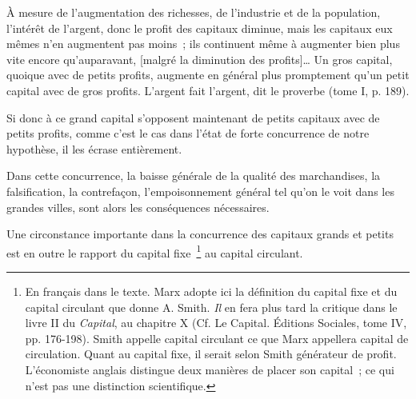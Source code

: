 \documentclass[french,twoside]{book} %
\begin{document}
\noindent À mesure de l’augmentation des richesses, de l’industrie et de la population, l’intérêt de l’argent, donc le profit des capitaux diminue, mais les capitaux eux mêmes n’en augmentent pas moins ; ils continuent même à augmenter bien plus vite encore qu’auparavant, [malgré la diminution des profits]… Un gros capital, quoique avec de petits profits, augmente en général plus promptement qu’un petit capital avec de gros profits. L’argent fait l’argent, dit le proverbe (tome I, p. 189).\par
Si donc à ce grand capital s’opposent maintenant de petits capitaux avec de petits profits, comme c’est le cas dans l’état de forte concurrence de notre hypothèse, il les écrase entièrement.\par
Dans cette concurrence, la baisse générale de la qualité des marchandises, la falsification, la contrefaçon, l’empoisonnement général tel qu’on le voit dans les grandes villes, sont alors les conséquences nécessaires.\par
[X] Une circonstance importante dans la concurrence des capitaux grands et petits est en outre le rapport du capital fixe \footnote{En français dans le texte. Marx adopte ici la définition du capital fixe et du capital circulant que donne A. Smith. \emph{Il} en fera plus tard la critique dans le livre II du \emph{Capital}, au chapitre X (Cf. Le Capital. Éditions Sociales, tome IV, pp. 176-198). Smith appelle capital circulant ce que Marx appellera capital de circulation. Quant au capital fixe, il serait selon Smith générateur de profit. L’économiste anglais distingue deux manières de placer son capital ; ce qui n’est pas une distinction scientifique.} au capital circulant.\par
\end{document}
